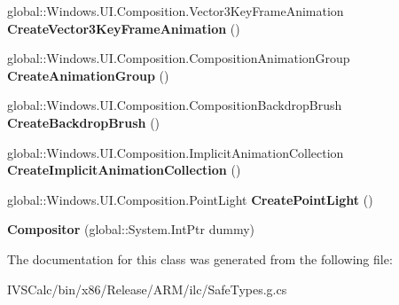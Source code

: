 \begin{DoxyCompactItemize}
\item 
\mbox{\label{class_windows_1_1_u_i_1_1_composition_1_1_compositor_af205bcd47f5aca9d484b62336a89d804}} 
global\+::\+Windows.\+U\+I.\+Composition.\+Vector3\+Key\+Frame\+Animation {\bfseries Create\+Vector3\+Key\+Frame\+Animation} ()
\item 
\mbox{\label{class_windows_1_1_u_i_1_1_composition_1_1_compositor_a80a2b13bdd26b7fead234728f4e048a4}} 
global\+::\+Windows.\+U\+I.\+Composition.\+Composition\+Animation\+Group {\bfseries Create\+Animation\+Group} ()
\item 
\mbox{\label{class_windows_1_1_u_i_1_1_composition_1_1_compositor_a718536eab5dc7541088008ef9798ad19}} 
global\+::\+Windows.\+U\+I.\+Composition.\+Composition\+Backdrop\+Brush {\bfseries Create\+Backdrop\+Brush} ()
\item 
\mbox{\label{class_windows_1_1_u_i_1_1_composition_1_1_compositor_a24135a36c54df364a599ced5e16e5440}} 
global\+::\+Windows.\+U\+I.\+Composition.\+Implicit\+Animation\+Collection {\bfseries Create\+Implicit\+Animation\+Collection} ()
\item 
\mbox{\label{class_windows_1_1_u_i_1_1_composition_1_1_compositor_abbf5f6803a17b21b39e1cf6a0b23fc6e}} 
global\+::\+Windows.\+U\+I.\+Composition.\+Point\+Light {\bfseries Create\+Point\+Light} ()
\item 
\mbox{\label{class_windows_1_1_u_i_1_1_composition_1_1_compositor_ae8673b74eda4f57113626510ac491007}} 
{\bfseries Compositor} (global\+::\+System.\+Int\+Ptr dummy)
\end{DoxyCompactItemize}


The documentation for this class was generated from the following file\+:\begin{DoxyCompactItemize}
\item 
I\+V\+S\+Calc/bin/x86/\+Release/\+A\+R\+M/ilc/Safe\+Types.\+g.\+cs\end{DoxyCompactItemize}

